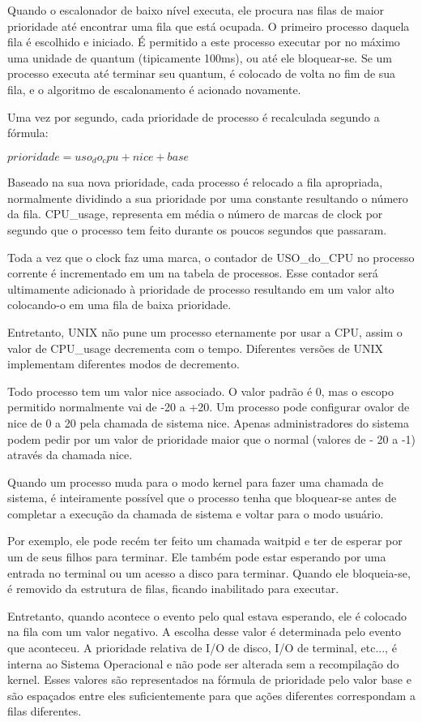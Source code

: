 Quando o escalonador de baixo nível executa, ele procura nas filas de maior prioridade até encontrar uma fila que está ocupada. O primeiro processo daquela fila é escolhido e iniciado. É permitido a este processo executar por no máximo uma unidade de quantum (tipicamente 100ms), ou até ele bloquear-se. Se um processo executa até terminar seu quantum, é colocado de volta no fim de sua fila, e o algoritmo de escalonamento é acionado novamente. 

Uma vez por segundo, cada prioridade de processo é recalculada segundo a fórmula:

$	prioridade = uso_do_cpu + nice + base$

Baseado na sua nova prioridade, cada processo é relocado a fila apropriada, normalmente dividindo a sua prioridade por uma constante resultando o número da fila. CPU\_usage, representa em média o número de marcas de clock por segundo que o processo tem feito durante os poucos segundos que passaram.

Toda a vez que o clock faz uma marca, o contador de USO\_do\_CPU no processo corrente é incrementado em um na tabela de processos. Esse contador será ultimamente adicionado à prioridade de processo resultando em um valor alto colocando-o em uma fila de baixa prioridade.

Entretanto, UNIX não pune um processo eternamente por usar a CPU, assim o valor de CPU\_usage decrementa com o tempo. Diferentes versões de UNIX implementam diferentes modos de decremento.

Todo processo tem um valor nice associado. O valor padrão é 0, mas o escopo permitido normalmente vai de -20 a +20. Um processo pode configurar ovalor de nice de 0 a 20 pela chamada de sistema nice. Apenas administradores do sistema podem pedir por um valor de prioridade maior que o normal (valores de - 20 a -1) através da chamada nice. 

Quando um processo muda para o modo kernel para fazer uma chamada de sistema, é inteiramente possível que o processo tenha que bloquear-se antes de completar a execução da chamada de sistema e voltar para o modo usuário.

Por exemplo, ele pode recém ter feito um chamada waitpid e ter de esperar por um de seus filhos para terminar. Ele também pode estar esperando por uma entrada no terminal ou um acesso a disco para terminar. Quando ele bloqueia-se, é removido da estrutura de filas, ficando inabilitado para executar.

Entretanto, quando acontece o evento pelo qual estava esperando, ele é colocado na fila com um valor negativo. A escolha desse valor é determinada pelo evento que aconteceu. A prioridade relativa de I/O de disco, I/O de terminal, etc..., é interna ao Sistema Operacional e não pode ser alterada sem a recompilação do kernel. Esses valores são representados na fórmula de prioridade pelo valor base e são espaçados entre eles suficientemente para que ações diferentes correspondam a filas diferentes.


